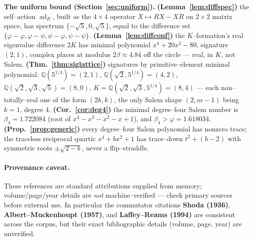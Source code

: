 \documentclass[11pt]{article}
\theoremstyle{plain}
\theoremstyle{definition}
\theoremstyle{remark}
\newcommand{\Q}{\mathbb{Q}}
\begin{document}
\medskip\noindent\textbf{The uniform bound (Section~\ref{sec:uniform}).} \textbf{(Lemma~\ref{lem:diffspec})} the self--action $\operatorname{ad}_R$, built as the $4\times4$ operator $X\mapsto RX-XR$ on $2\times2$ matrix space, has spectrum $\{-\sqrt5,0,\sqrt5\}$, equal to the difference set $\{\varphi-\varphi,\varphi-\psi,\psi-\varphi,\psi-\psi\}$. \textbf{(Lemma~\ref{lem:diffconf})} the $K$--formation's real eigenvalue difference $2K$ has minimal polynomial $x^4+20x^2-80$, signature $(2,1)$, complex places at modulus $2\beta\approx4.84$ off the circle --- real, in $K$, not Salem. \textbf{(Thm.~\ref{thm:siglattice})} signatures by primitive--element minimal polynomial: $\Q(5^{1/4})=(2,1)$, $\Q(\sqrt2,5^{1/4})=(4,2)$, $\Q(\sqrt2,\sqrt3,\sqrt5)=(8,0)$, $K=\Q(\sqrt2,\sqrt3,5^{1/4})=(8,4)$ --- each non--totally--real one of the form $(2k,k)$, the only Salem shape $(2,m-1)$ being $k=1$, degree $4$. \textbf{(Cor.~\ref{cor:deg4})} the minimal degree--four Salem number is $\beta_4=1.722084$ (root of $x^4-x^3-x^2-x+1$), and $\beta_4>\varphi=1.618034$. \textbf{(Prop.~\ref{prop:generic})} every degree--four Salem polynomial has nonzero trace; the traceless reciprocal quartic $x^4+bx^2+1$ has trace--down $t^2+(b-2)$ with symmetric roots $\pm\sqrt{2-b}$, never a flip--straddle.

\paragraph{Provenance caveat.} These references are standard attributions supplied from memory; volume/page/year details are \emph{not} machine--verified --- check primary sources before external use. In particular the commutator citations \textbf{Shoda (1936)}, \textbf{Albert--Muckenhoupt (1957)}, and \textbf{Laffey--Reams (1994)} are consistent across the corpus, but their exact bibliographic details (volume, page, year) are unverified.
\end{document}
